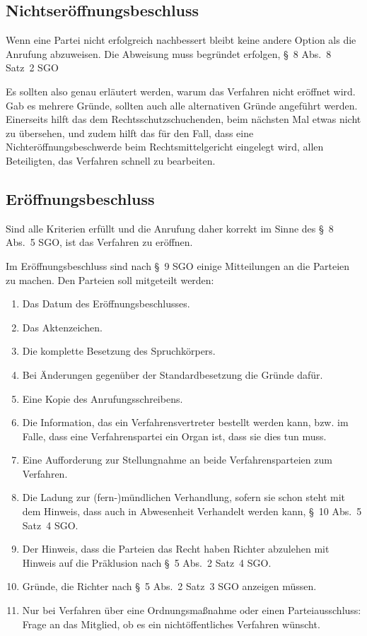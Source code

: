 \subsection{Nichtseröffnungsbeschluss}
\label{Standardworkflow:Beschluss:Nichteroeffnung}
Wenn eine Partei nicht erfolgreich nachbessert bleibt keine andere Option als die Anrufung abzuweisen.
Die Abweisung muss begründet erfolgen, \S~8 Abs.~8 Satz~2 SGO

Es sollten also genau erläutert werden, warum das Verfahren nicht eröffnet wird.
Gab es mehrere Gründe, sollten auch alle alternativen Gründe angeführt werden.
Einerseits hilft das dem Rechtsschutzschuchenden, beim nächsten Mal etwas nicht zu übersehen, und zudem hilft das für den Fall, dass eine Nichteröffnungsbeschwerde beim Rechtsmittelgericht eingelegt wird, allen Beteiligten, das Verfahren schnell zu bearbeiten.

\subsection{Eröffnungsbeschluss}
\label{Standardworkflow:Beschluss:Eroeffnung}
Sind alle Kriterien erfüllt und die Anrufung daher korrekt im Sinne des \S~8 Abs.~5 SGO, ist das Verfahren zu eröffnen.

Im Eröffnungsbeschluss sind nach \S~9 SGO einige Mitteilungen an die Parteien zu machen.
Den Parteien soll mitgeteilt werden:
\begin{enumerate}
\item Das Datum des Eröffnungsbeschlusses.
\item Das Aktenzeichen.
\item Die komplette Besetzung des Spruchkörpers.
\item Bei Änderungen gegenüber der Standardbesetzung die Gründe dafür.
\item Eine Kopie des Anrufungsschreibens.
\item Die Information, das ein Verfahrensvertreter bestellt werden kann, bzw. im Falle, dass eine Verfahrenspartei ein Organ ist, dass sie dies tun muss.
\item Eine Aufforderung zur Stellungnahme an beide Verfahrensparteien zum Verfahren.
\item Die Ladung zur (fern-)mündlichen Verhandlung, sofern sie schon steht mit dem Hinweis, dass auch in Abwesenheit Verhandelt werden kann, \S~10 Abs.~5 Satz~4 SGO.
\item Der Hinweis, dass die Parteien das Recht haben Richter abzulehen mit Hinweis auf die Präklusion nach \S~5 Abs.~2 Satz~4 SGO.
\item Gründe, die Richter nach \S~5 Abs.~2 Satz~3 SGO anzeigen müssen.
\item Nur bei Verfahren über eine Ordnungsmaßnahme oder einen Parteiausschluss: Frage an das Mitglied, ob es ein nichtöffentliches Verfahren wünscht.
\end{enumerate}

